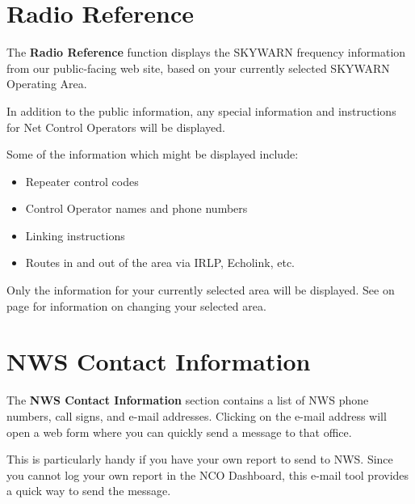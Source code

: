 \documentclass[pdflatex,letterpaper,twoside,12pt]{book}
\begin{document}
\section{Radio Reference}\label{dash-radio-ref}

The \textbf{Radio Reference} function displays the SKYWARN frequency information from our public-facing web site, based on your currently selected SKYWARN Operating Area.

In addition to the public information, any special information and instructions for Net Control Operators will be displayed.

Some of the information which might be displayed include:

\begin{itemize}
\item Repeater control codes
\item Control Operator names and phone numbers
\item Linking instructions
\item Routes in and out of the area via IRLP, Echolink, etc.
\end{itemize}

Only the information for your currently selected area will be displayed.  See  on page \pageref{dash-set-area} for information on changing your selected area.



\section{NWS Contact Information}\label{dash-send-email}

The \textbf{NWS Contact Information} section contains a list of NWS phone numbers, call signs, and e-mail addresses.  Clicking on the e-mail address will open a web form where you can quickly send a message to that office.

This is particularly handy if you have your own report to send to NWS.  Since you cannot log your own report in the NCO Dashboard, this e-mail tool provides a quick way to send the message.
\end{document}
